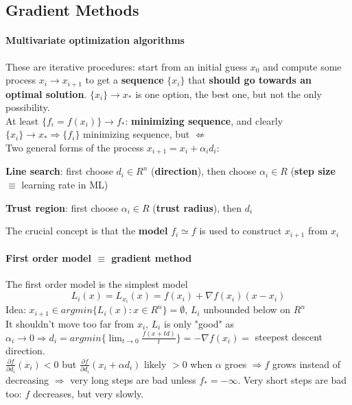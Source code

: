 \documentclass[10pt]{report}
\begin{document}
\subsection{Gradient Methods}
\paragraph{Multivariate optimization algorithms} These are iterative procedures: start from an initial guess $x_0$ and compute some process $x_i \longrightarrow x_{i+1}$ to get a \textbf{sequence} $\{x_i\}$ that \textbf{should go towards an optimal solution}. $\{x_i\}\rightarrow x_*$ is one option, the best one, but not the only possibility.\\
At least $\{f_i = f(x_i)\} \rightarrow f_*$: \textbf{minimizing sequence}, and clearly $\{x_i\}\rightarrow x_* \Rightarrow \{f_i\}$ minimizing sequence, but $\not\Leftarrow$\\
Two general forms of the process $x_{i+1} = x_i + \alpha_id_i$:
\begin{list}{}{}
	\item \textbf{Line search}: first choose $d_i\in R^n$ (\textbf{direction}), then choose $\alpha_i\in R$ (\textbf{step size} $\equiv$ learning rate in ML)
	\item \textbf{Trust region}: first choose $\alpha_i\in R$ (\textbf{trust radius}), then $d_i$
\end{list}
The crucial concept is that the \textbf{model} $f_i \simeq f$ is used to construct $x_{i+1}$ from $x_i$
\paragraph{First order model $\equiv$ gradient method} The first order model is the simplest model $$L_i(x) = L_{x_i}(x) = f(x_i) + \nabla f(x_i)(x-x_i)$$ Idea: $x_{i+1} \in argmin\{L_i(x) : x\in R^n\} = \emptyset$, $L_i$ unbounded below on $R^n$\\
It shouldn't move too far from $x_i$, $L_i$ is only "good" as $\alpha_i\rightarrow 0 \Rightarrow d_i = argmin\{\lim_{t\to 0} \frac{f(x+td)}{t}\} = -\nabla f(x_i) =$ steepest descent direction.\\
$\frac{\partial f}{\partial d_i}(x_i) < 0$ but $\frac{\partial f}{\partial d_i}(x_i + \alpha d_i)$ likely $> 0$ when $\alpha$ groes $\Rightarrow f$ grows instead of decreasing $\Rightarrow$ very long steps are bad unless $f_* = -\infty$. Very short steps are bad too: $f$ decreases, but very slowly.
\end{document}
